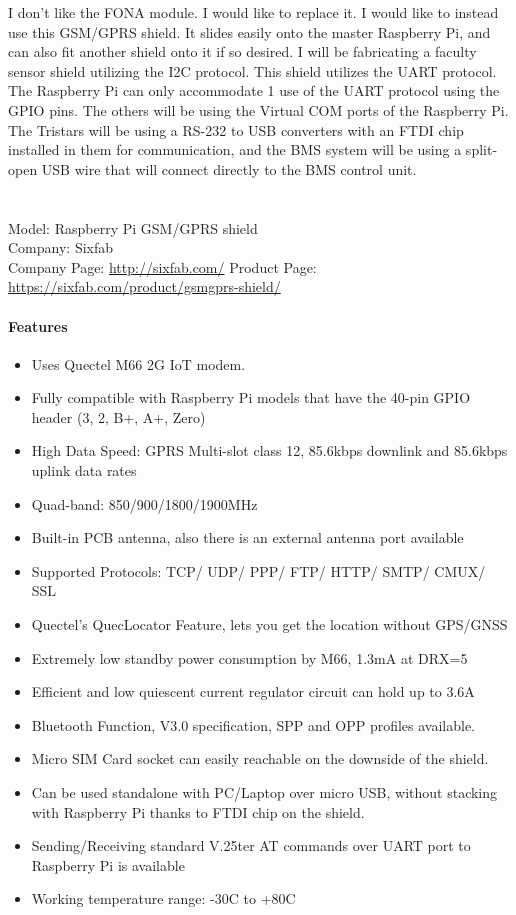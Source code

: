 I don’t like the FONA module. I would like to replace it. I would like to instead use this GSM/GPRS shield. It slides easily onto the master Raspberry Pi, and can also fit another shield onto it if so desired. I will be fabricating a faculty sensor shield utilizing the I2C protocol. This shield utilizes the UART protocol. The Raspberry Pi can only accommodate 1 use of the UART protocol using the GPIO pins. The others will be using the Virtual COM ports of the Raspberry Pi. The Tristars will be using a RS-232 to USB converters with an FTDI chip installed in them for communication, and the BMS system will be using a split-open USB wire that will connect directly to the BMS control unit.\\
 \\
 \\
Model: Raspberry Pi GSM/GPRS shield \\
Company: Sixfab \\
Company Page: \href{http://sixfab.com/}{http://sixfab.com/}
Product Page: \href{https://sixfab.com/product/gsmgprs-shield/}{https://sixfab.com/product/gsmgprs-shield/}

\paragraph{Features}
\begin{itemize}
	\item Uses Quectel M66 2G IoT modem.
	\item Fully compatible with Raspberry Pi models that have the 40-pin GPIO header (3, 2, B+, A+, Zero)
	\item High Data Speed: GPRS Multi-slot class 12, 85.6kbps downlink and 85.6kbps uplink data rates
	\item Quad-band: 850/900/1800/1900MHz
	\item Built-in PCB antenna, also there is an external antenna port available
	\item Supported Protocols: TCP/ UDP/ PPP/ FTP/ HTTP/ SMTP/ CMUX/ SSL
	\item Quectel’s QuecLocator Feature, lets you get the location without GPS/GNSS
	\item Extremely low standby power consumption by M66, 1.3mA at DRX=5
	\item Efficient and low quiescent current regulator circuit can hold up to 3.6A
	\item Bluetooth Function, V3.0 specification, SPP and OPP profiles available.
	\item Micro SIM Card socket can easily reachable on the downside of the shield.
	\item Can be used standalone with PC/Laptop over micro USB, without stacking with Raspberry Pi thanks to FTDI chip on the shield.
	\item Sending/Receiving standard V.25ter AT commands over UART port to Raspberry Pi is available
	\item Working temperature range: -30\degree C to +80\degree C
\end{itemize}

